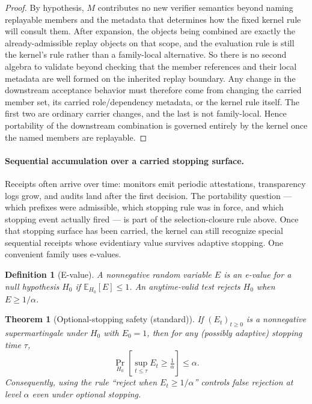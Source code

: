 \documentclass[11pt]{article}
\newtheorem{definition}{Definition}
\newtheorem{theorem}{Theorem}
\theoremstyle{remark}
\begin{document}
\begin{proof}
By hypothesis, $M$ contributes no new verifier semantics beyond naming replayable members and the metadata that determines how the fixed kernel rule will consult them.
After expansion, the objects being combined are exactly the already-admissible replay objects on that scope, and the evaluation rule is still the kernel's rule rather than a family-local alternative.
So there is no second algebra to validate beyond checking that the member references and their local metadata are well formed on the inherited replay boundary.
Any change in the downstream acceptance behavior must therefore come from changing the carried member set, its carried role/dependency metadata, or the kernel rule itself.
The first two are ordinary carrier changes, and the last is not family-local.
Hence portability of the downstream combination is governed entirely by the kernel once the named members are replayable.
\end{proof}

\paragraph{Sequential accumulation over a carried stopping surface.}
Receipts often arrive over time: monitors emit periodic attestations, transparency logs grow, and audits land after the first decision.
The portability question --- which prefixes were admissible, which stopping rule was in force, and which stopping event actually fired --- is part of the selection-closure rule above.
Once that stopping surface has been carried, the kernel can still recognize special sequential receipts whose evidentiary value survives adaptive stopping.
One convenient family uses e-values.

\begin{definition}[E-value]
A nonnegative random variable $E$ is an e-value for a null hypothesis $H_0$ if $\mathbb{E}_{H_0}[E]\le 1$.
An anytime-valid test rejects $H_0$ when $E\ge 1/\alpha$.
\end{definition}

\begin{theorem}[Optional-stopping safety (standard)]
If $(E_t)_{t\ge 0}$ is a nonnegative supermartingale under $H_0$ with $E_0=1$, then for any (possibly adaptive) stopping time $\tau$,
\[
\Pr_{H_0}\!\left[\sup_{t\le \tau} E_t \ge \tfrac{1}{\alpha}\right] \le \alpha.
\]
Consequently, using the rule ``reject when $E_t\ge 1/\alpha$'' controls false rejection at level $\alpha$ even under optional stopping.
\end{theorem}
\end{document}
